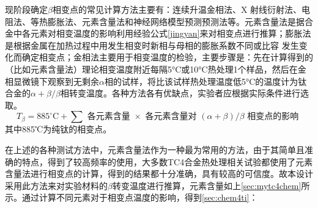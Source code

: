 现阶段确定$ \beta $相变点的常见计算方法\cite{zhuhongTaihejinaVxiangbiandiandejizhongceshifangfatantao2013}主要有：连续升温金相法、X 射线衍射法、电阻法、等热膨胀法、元素含量法和神经网络模型预测预测法\cite{renchiqiangGurongshixiaoduiTC4taihejinxianweizuzhihelixuexingnengdeyingxiang2022}等。元素含量法是据合金中各元素对相变温度的影响\cite{ananyaLocationBasedIntelligent2011}利用经验公式\ref{jingyan}来对相变点进行推算；膨胀法是根据金属在加热过程中用发生相变时新相与母相的膨胀系数不同或比容 发生变化而确定相变点；金相法主要用于相变温度的检验，主要步骤是：先在计算得到的（比如元素含量法）理论相变温度附近每隔5°C或10°C热处理1个样品，然后在金相显微镜下观察到无剩余$\alpha$相的试样，将比该试样热处理温度低5°C的温度计为钛合金的$\alpha+\beta/\beta$相转变温度。各种方法各有优缺点，实验者应根据实际条件进行选取。
\begin{equation}
	T_\beta=885^{\circ} \mathrm{C}+\sum \textit{ 各元素含量 } \times \textit{ 各元素含量对 }(\alpha+\beta) / \beta \textit{ 相变点的影响 }
	\label{jingyan}
\end{equation}
其中885℃为纯钛的相变点。

在上述的各种测试方法中，元素含量法作为一种最为常用的方法，由于其简单且准确的特点，得到了较高频率的使用，大多数TC4合金热处理相关试验都使用了元素含量法进行相变点的计算\cite{LiuLeiTi6Al4VTaiHeJinBuTongReChuLiFangFaDeShiYanYuFuHeCaiLiaoLiXueXingNengFenXi2022,zouhaibeiTC4taihejinrechuliqianghuagongyijixiangbianhangweiyanjiu2019,liutaoRechuliduiTC4taihejindongtailixuexingnengheweiguanzuzhideyingxiang,baoxuechunRechuligongyiduiTC4taihejinzuzhihelixuexingnengdeyingxiang2019,wangpuqiangButongrechuligongyixiajiguangzengcaizhizaoTC4taihejinzuzhiyuxingnengyanjiujinzhan2020}，得到的结果都十分准确，具有较高的可信度。故本设计采用此方法来对实验材料的$\beta$转变温度进行推算，元素含量如上\ref{sec:mytc4chem}所示。通过计算不同元素对于相变点温度的影响，得到\ref{sec:chem4ti}：

